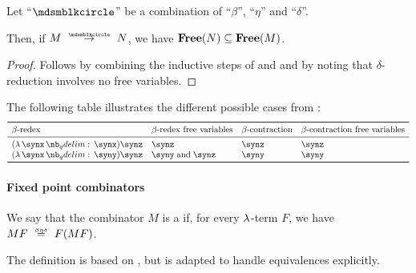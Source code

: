 \begin{proposition}\label{thm:lambda_term_reduction_free_variables}
  Let \enquote{\( {\Anon} \)} be a combination of \enquote{\( \beta \)}, \enquote{\( \eta \)} and \enquote{\( \delta \)}.

  Then, if \( M \pred N \), we have \( \op*{Free}(N) \subseteq \op*{Free}(M) \).
\end{proposition}
\begin{proof}
  Follows by combining the inductive steps of  and  and by noting that \( \delta \)-reduction involves no free variables.
\end{proof}

\begin{example}\label{ex:thm:lambda_term_reduction_free_variables}
  The following table illustrates the different possible cases from :
  \begin{equation*}
    \begin{array}{*{4}{l}}
      \toprule
      \T{\( \beta \)-redex}     & \T{\( \beta \)-redex free variables} & \T{\( \beta \)-contraction} & \T{\( \beta \)-contraction free variables} \\
      \midrule
      (\qabs \synx \synx) \synz & \synz                                & \synz                       & \synz                                      \\
      (\qabs \synx \syny) \synz & \syny \T{and} \synz                  & \syny                       & \syny                                      \\
      \bottomrule
    \end{array}
  \end{equation*}
\end{example}

\paragraph{Fixed point combinators}

\begin{definition}\label{def:function_fixed_point_combinator}\mimprovised
  We say that the combinator \( M \) is a  if, for every \( \mathrm{\lambda} \)-term \( F \), we have \( MF \equivrel{\beta\eta\delta} F(MF) \).
\end{definition}
\begin{comments}
  \item The definition is based on \cite[\S 6.1.2]{Barendregt1984LambdaCalculus}, but is adapted to handle equivalences explicitly.
\end{comments}

